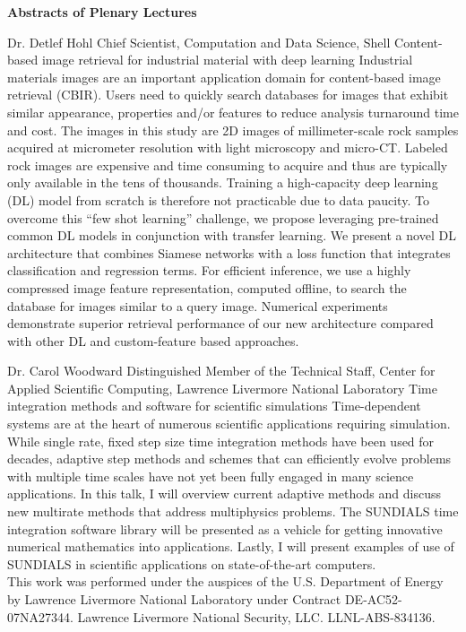 \begin{center}
\label{plenary}
{\Large \bfseries Abstracts of Plenary Lectures}
\end{center}
\vspace{1ex}


\label{plenary1}
\plenabs
{Dr. Detlef Hohl}
{Chief Scientist, Computation and Data Science, Shell}
{Content-based image retrieval for industrial material with deep learning}
{Industrial materials images are an important application domain for content-based image retrieval (CBIR). Users need to quickly search databases for images that exhibit similar appearance, properties and/or features to reduce analysis turnaround time and cost. The images in this study are 2D images of millimeter-scale rock samples acquired at micrometer resolution with light microscopy and micro-CT. Labeled rock images are expensive and time consuming to acquire and thus are typically only available in the tens of thousands. Training a high-capacity deep learning (DL) model from scratch is therefore not practicable due to data paucity. To overcome this ``few shot learning'' challenge, we propose leveraging pre-trained common DL models in conjunction with transfer learning.  We present a novel DL architecture that combines Siamese networks with a loss function that integrates classification and regression terms. For efficient inference, we use a highly compressed image feature representation, computed offline, to search the database for images similar to a query image. Numerical experiments demonstrate superior retrieval performance of our new architecture compared with other DL and custom-feature based approaches.}
\bigskip

\label{plenary2}
\plenabs
{Dr. Carol Woodward}
{Distinguished Member of the Technical Staff, Center for Applied Scientific Computing, Lawrence Livermore National Laboratory}
{Time integration methods and software for scientific simulations}
{Time-dependent systems are at the heart of numerous scientific applications requiring simulation. While single rate, fixed step size time integration methods have been used for decades, adaptive step methods and schemes that can efficiently evolve problems with multiple time scales have not yet been fully engaged in many science applications. In this talk, I will overview current adaptive methods and discuss new multirate methods that address multiphysics problems. The SUNDIALS time integration software library will be presented as a vehicle for getting innovative numerical mathematics into applications. Lastly, I will present examples of use of SUNDIALS in scientific applications on state-of-the-art computers.\\
This work was performed under the auspices of the U.S. Department of Energy by Lawrence Livermore National Laboratory under Contract DE-AC52-07NA27344. Lawrence Livermore National Security, LLC. LLNL-ABS-834136.}
\bigskip


